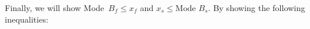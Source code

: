 \documentclass[12pt,letterpaper]{article}
\begin{document}
\par
Finally, we will show \mbox{Mode $B_f\le x_f$} and \mbox{$x_s\le\text{Mode }B_s$}. 
By showing the following inequalities:
\end{document}
